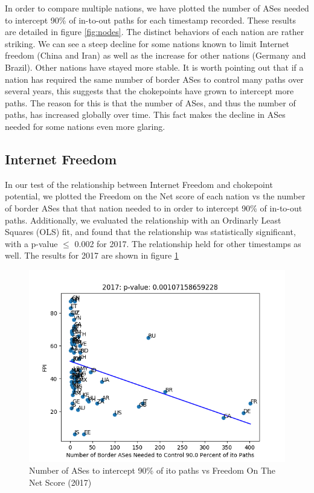 \documentclass[10pt, conference, letterpaper]{IEEEtran}
\begin{document}
\par
In order to compare multiple nations, we have plotted the number of ASes needed to intercept 90\% of in-to-out paths
for each timestamp recorded. These results are detailed in figure \ref{fig:nodes}.
The distinct behaviors of each nation are rather striking. We can see a steep decline for some
nations known to limit Internet freedom (China and Iran) as well as the increase for other nations
(Germany and Brazil). Other nations have stayed more stable. It is worth pointing out that if a nation
has required the same number of border ASes to control many paths over several years, this suggests
that the chokepoints have grown to intercept more paths. The reason for this is that the number of ASes,
and thus the number of paths, has increased globally over time. This fact makes the decline in ASes
needed for some nations even more glaring.


\subsection{Internet Freedom}

In our test of the relationship between Internet Freedom and chokepoint potential, we plotted the Freedom on the Net score
of each nation vs the number of border ASes that that nation needed to in order to intercept 90\% of in-to-out paths. Additionally,
we evaluated the relationship with an Ordinarly Least Squares (OLS) fit, and found that the relationship was statistically significant,
with a p-value $\leq$ 0.002 for 2017. The relationship held for other timestamps as well. The results for 2017 are shown in figure \ref{fig:fotn2017}

\begin{figure}
	\centering
	\includegraphics[width=\linewidth]{fotn2017}
	\caption{Number of ASes to intercept 90\% of ito paths vs Freedom On The Net Score (2017)}\label{fig:fotn2017}
\end{figure}
\end{document}
